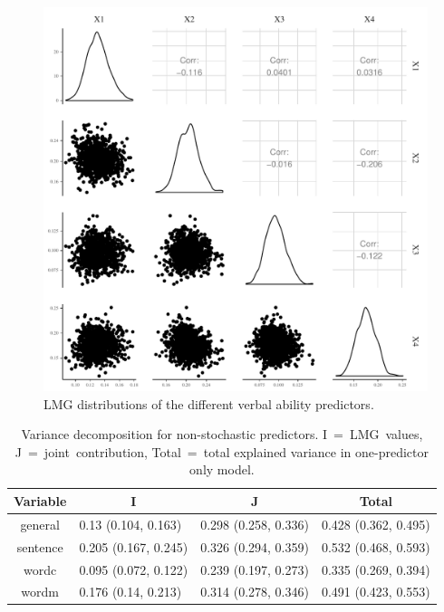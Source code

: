 \documentclass[11pt,a4paper,twoside]{book}\usepackage[]{graphicx}\usepackage[]{color}
\newenvironment{knitrout}{}{} %
\begin{document}
\begin{knitrout}
\color{fgcolor}\begin{figure}

{\centering \includegraphics[width=\textwidth-3cm]{figure/ch03_figempi_lmg_plot-1} 

}

\caption[LMG distributions of the different verbal ability predictors]{LMG distributions of the different verbal ability predictors.}\label{fig:empi.lmg.plot}
\end{figure}


\end{knitrout}


\begin{table}[h]
\caption{Variance decomposition for non-stochastic predictors. I~=~LMG~values, J~=~joint~contribution, Total~=~total explained variance in one-predictor only model.}
\centering
\begin{tabular}{clll}
  \toprule
  \multicolumn{1}{c}{\textbf{Variable}} & \multicolumn{1}{c}{\textbf{I}} &\multicolumn{1}{c}{\textbf{J}} & \multicolumn{1}{c}{\textbf{Total}} \\
  \hline
general & 0.13 (0.104, 0.163)  & 0.298 (0.258, 0.336)   & 0.428 (0.362, 0.495)  \\ 
sentence & 0.205 (0.167, 0.245)  & 0.326 (0.294, 0.359)   & 0.532 (0.468, 0.593)  \\ 
wordc & 0.095 (0.072, 0.122)  & 0.239 (0.197, 0.273)   & 0.335 (0.269, 0.394)  \\ 
wordm & 0.176 (0.14, 0.213)  & 0.314 (0.278, 0.346)   & 0.491 (0.423, 0.553)  \\ 
   \bottomrule
\end{tabular}
\label{tbl:empirical.ijt}
\end{table}
\end{document}
